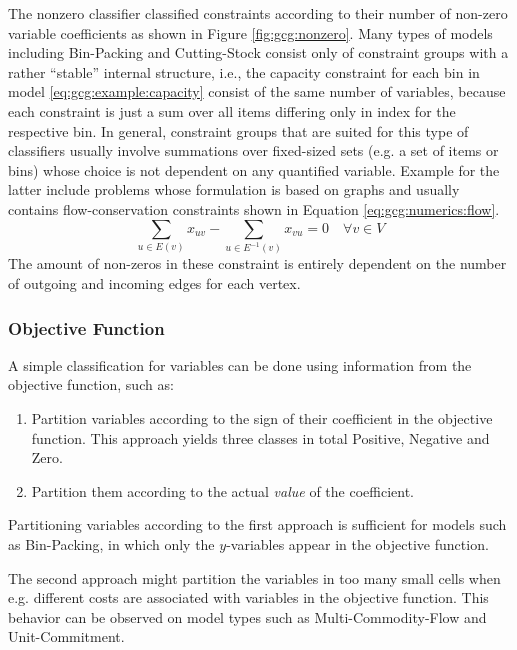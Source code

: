				The nonzero classifier classified constraints according to their number of non-zero variable coefficients as shown in Figure \ref{fig:gcg:nonzero}.
				Many types of models including Bin-Packing and Cutting-Stock consist only of constraint groups with a rather \enquote{stable} internal structure, i.e., the capacity constraint for each bin in model \ref{eq:gcg:example:capacity}  consist of the same number of variables, because each constraint is just a sum over all items differing only in index for the respective bin.
				In general, constraint groups that are suited for this type of classifiers usually involve summations over fixed-sized sets (e.g. a set of items or bins) whose choice is not dependent on any quantified variable.
				Example for the latter include problems whose formulation is based on graphs and usually contains flow-conservation constraints shown in Equation \ref{eq:gcg:numerics:flow}. 
				\begin{equation}
					\label{eq:gcg:numerics:flow}
					\sum_{u \in E(v)} x_{uv} - \sum_{u \in E^{-1}(v)} x_{vu} = 0\quad \forall v \in V
				\end{equation}
				The amount of non-zeros in these constraint is entirely dependent on the number of outgoing and incoming edges for each vertex.
		
			\subsubsection{Objective Function}
			
				A simple classification for variables can be done using information from the objective function, such as:
				
				\begin{enumerate}
					\item Partition variables according to the sign of their coefficient in the objective function. This approach yields three classes in total Positive, Negative and Zero.
					\item Partition them according to the actual \textit{value} of the coefficient.
				\end{enumerate}
				
				Partitioning variables according to the first approach is sufficient for models such as Bin-Packing, in which only the $y$-variables appear in the objective function.
				
				The second approach might partition the variables in too many small cells when e.g. different costs are associated with variables in the objective function.
				This behavior can be observed on model types such as Multi-Commodity-Flow and Unit-Commitment.
				
